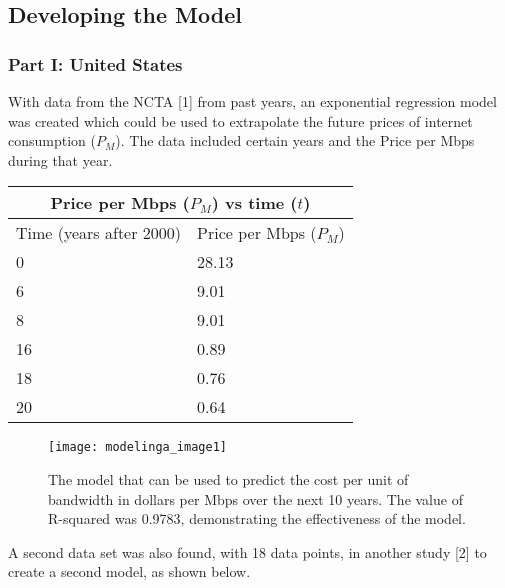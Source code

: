 	\subsection{Developing the Model}
	\subsubsection{Part I: United States}

	With data from the NCTA [1] from past years, an exponential regression model was created which could be used to extrapolate the future prices of internet consumption ($P_M$). The data included certain years and the Price per Mbps during that year.

    \begin{center}
    \begin{tabular}{|l|l|}
    \hline
    \multicolumn{2}{|c|}{Price per Mbps ($P_M$) vs time ($t$)} \\ \hline
    Time (years after 2000)     & Price per Mbps ($P_M$)     \\ \hline
    0                           & 28.13                   \\ \hline
    6                           & 9.01                    \\ \hline
    8                           & 9.01                    \\ \hline
    16                          & 0.89                    \\ \hline
    18                          & 0.76                    \\ \hline
    20                          & 0.64                    \\ \hline
    \end{tabular}
    \end{center}
	
	
    \begin{figure}[htp]
    \centering
    \begin{minipage}{9cm}
    \texttt{[image: modelinga\_image1]}
    \caption{The model that can be used to predict the cost per unit of bandwidth in dollars per Mbps over the next 10 years. The value of R-squared was 0.9783, demonstrating the effectiveness of the model.}
    \label{fig:1}
    \end{minipage}
    
    \end{figure}
    
    A second data set was also found, with 18 data points, in another study [2] to create a second model, as shown below.
    
